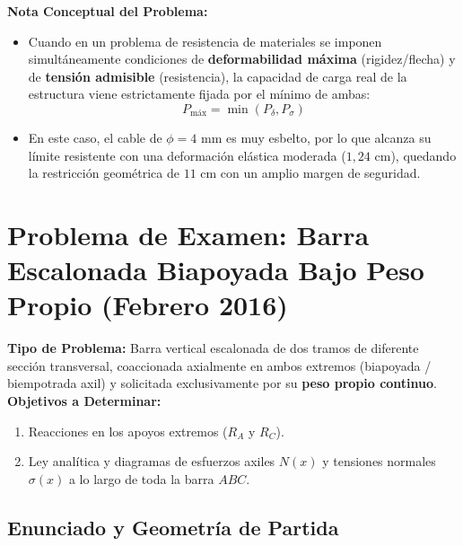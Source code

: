 \begin{tcolorbox}[colback=myg!10!white, colframe=myg!70!black, arc=4pt, boxrule=0.9pt]
    \textbf{Nota Conceptual del Problema:}
    \begin{itemize}
        \item Cuando en un problema de resistencia de materiales se imponen simultáneamente condiciones de \textbf{deformabilidad máxima} (rigidez/flecha) y de \textbf{tensión admisible} (resistencia), la capacidad de carga real de la estructura viene estrictamente fijada por el mínimo de ambas:
        $$P_{\text{máx}} = \min(P_{\delta}, P_{\sigma})$$
        \item En este caso, el cable de $\phi = 4\text{ mm}$ es muy esbelto, por lo que alcanza su límite resistente con una deformación elástica moderada ($1{,}24\text{ cm}$), quedando la restricción geométrica de $11\text{ cm}$ con un amplio margen de seguridad.
    \end{itemize}
\end{tcolorbox}

\section{Problema de Examen: Barra Escalonada Biapoyada Bajo Peso Propio (Febrero 2016)}

\begin{tcolorbox}[colback=white, colframe=myb!80!black, arc=4pt, boxrule=0.9pt, left=8pt, right=8pt, top=7pt, bottom=7pt]
    \textbf{Tipo de Problema:} Barra vertical escalonada de dos tramos de diferente sección transversal, coaccionada axialmente en ambos extremos (biapoyada / biempotrada axil) y solicitada exclusivamente por su \textbf{peso propio continuo}.\\
    \textbf{Objetivos a Determinar:}
    \begin{enumerate}[label=\alph*)]
        \item Reacciones en los apoyos extremos ($R_A$ y $R_C$).
        \item Ley analítica y diagramas de esfuerzos axiles $N(x)$ y tensiones normales $\sigma(x)$ a lo largo de toda la barra $ABC$.
    \end{enumerate}
\end{tcolorbox}

\subsection{Enunciado y Geometría de Partida}

